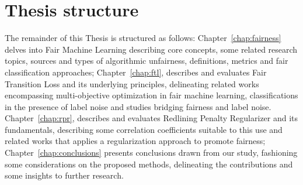 \section{Thesis structure}

The remainder of this Thesis is structured as follows: Chapter~\ref{chap:fairness} delves into Fair Machine Learning describing core concepts, some related research topics, sources and types of algorithmic unfairness, definitions, metrics and fair classification approaches; Chapter~\ref{chap:ftl}, describes and evaluates Fair Transition Loss and its underlying principles, delineating related works encompassing multi-objective optimization in fair machine learning, classifications in the presence of label noise and studies bridging fairness and label noise. Chapter~\ref{chap:rpr}, describes and evaluates Redlining Penalty Regularizer and its fundamentals, describing some correlation coefficients suitable to this use and related works that applies a regularization approach to promote fairness; Chapter~\ref{chap:conclusions} presents conclusions drawn from our study, fashioning some considerations on the proposed methods, delineating the contributions and some insights to further research.